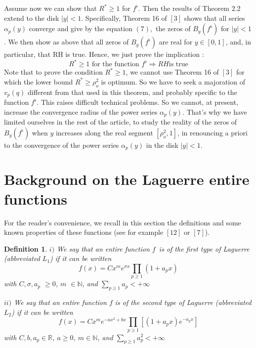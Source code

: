 \documentclass{article}
\newtheorem{definition}{Definition}
\begin{document}
Assume now we can show that $R^{\ast }\geq 1$ for $f^{\flat }$. Then the
results of Theorem 2.2 extend to the disk $\left| y\right| <1$.
Specifically, Theorem 16 of $\left[ 3\right] $ shows that all series $\alpha
_{p}\left( y\right) $ converge and give by the equation $\left( 7\right) $,\
the zeros of $B_{y}\left( f^{\flat }\right) $ for $\left| y\right| <1$. We
then show as above that all zeros of $B_{y}\left( f^{\flat }\right) $ are
real for $y\in \left[ 0,1\right] $, and, in particular, that RH is true.
Hence, we just prove the implication : 
\begin{equation}
R^{\ast }\geq 1\text{ for the function }f^{\flat }\Longrightarrow RH\text{
is true}
\end{equation}
Note that to prove the condition $R^{\ast }\geq 1$, we cannot use Theorem 16
of $\left[ 3\right] $ for which the lower bound $R^{\ast }\geq \rho _{o}^{2}$
is optimum. So we have to seek a majoration of $v_{p}\left( q\right) $
different from that used in this theorem, and probably specific to the
function $f^{\flat }$. This raises difficult technical problems. So we
cannot, at present, increase the convergence radius of the power series $\alpha _{p}\left( y\right) $. That's why we have limited ourselves in the
rest of the article, to study the reality of the zeros of $B_{y}\left(
f^{\flat }\right) $ when $y$ increases along the real segment $\left[ \rho
_{o}^{2},1\right] $, in renouncing a priori to the convergence of the power
series $\alpha _{p}\left( y\right) $ in the disk $\left| y\right| <1$.

\section{Background on the Laguerre entire functions}

\bigskip For the reader's convenience, we recall in this section the
definitions and some known properties of these functions (see for example $\left[ 12\right] $ or $\left[ 7\right] $).

\begin{definition}
$i)$ We say that an entire function $f$\ is of the first type of Laguerre
(abbreviated $L_{1}$) if it can be written 
\begin{equation*}
f\left( x\right) =Cx^{m}e^{\sigma x}\prod\limits_{p\geq 1}\left(
1+a_{p}x\right) 
\end{equation*}
with $C,\sigma ,a_{p}$ $\geq 0$, $m$ $\in \mathbb{N}$, and $\sum_{p\geq
1}a_{p}<+\infty $

\bigskip $ii)$ We say that an entire function $f$ is of the second type of
Laguerre (abbreviated $L_{2}$) if it can be written 
\begin{equation*}
f\left( x\right) =Cx^{m}e^{-ax^{2}+bx}\prod\limits_{p\geq 1}\left[ \left(
1+a_{p}x\right) e^{-a_{p}x}\right] 
\end{equation*}
with $C,b,a_{p}\in \mathbb{R}$, $a\geq 0$, $m\in \mathbb{N}$, and $\sum_{p\geq 1}a_{p}^{2}<+\infty $
\end{definition}
\end{document}
